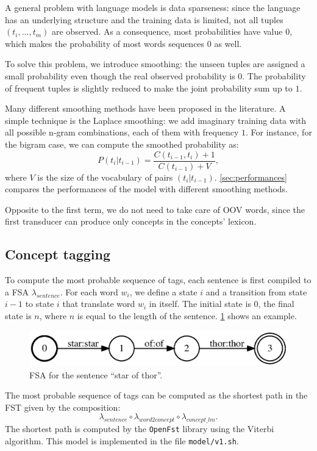 A general problem with language models is data sparseness:
since the language has an underlying structure and the training data is limited, not all tuples $(t_i, ..., t_m)$ are observed.
As a consequence, most probabilities have value $0$, which makes the probability of most words sequences $0$ as well.

To solve this problem, we introduce smoothing:
the unseen tuples are assigned a small probability even though the real observed probability is $0$.
The probability of frequent tuples is slightly reduced to make the joint probability sum up to $1$.

Many different smoothing methods have been proposed in the literature.
A simple technique is the Laplace smoothing:
we add imaginary training data with all possible n-gram combinations, each of them with frequency $1$.
For instance, for the bigram case, we can compute the smoothed probability as:
\begin{equation*}
    P(t_i | t_{i-1}) = \frac{C(t_{i-1}, t_i) + 1}{C(t_{i-1}) + V},
\end{equation*}
where $V$ is the size of the vocabulary of pairs $(t_i | t_{i-1})$.
\cref{sec:performances} compares the performances of the model with different smoothing methods. 

Opposite to the first term, we do not need to take care of \ac{OOV} words, since the first transducer can produce only concepts in the concepts' lexicon.

\subsection{Concept tagging}
To compute the most probable sequence of tags, each sentence is first compiled to a \ac{FSA} $\lambda_{sentence}$.
For each word $w_i$, we define a state $i$ and a transition from state $i-1$ to state $i$ that translate word $w_i$ in itself.
The initial state is $0$, the final state is $n$, where $n$ is equal to the length of the sentence.
\cref{fig:fsa_sentence} shows an example.

\begin{figure}[h]
	\centering
	\includegraphics[width=.9\columnwidth]{figures/fsa}
	\caption{\ac{FSA} for the sentence ``star of thor''.}
	\label{fig:fsa_sentence}
\end{figure}

The most probable sequence of tags can be computed as the shortest path in the \ac{FST} given by the composition:
\begin{equation*}
    \lambda_{sentence} \circ \lambda_{word2concept} \circ \lambda_{concept\_lm}.
\end{equation*}
The shortest path is computed by the \texttt{OpenFst} library using the Viterbi algorithm.
This model is implemented in the file \texttt{model/v1.sh}.
